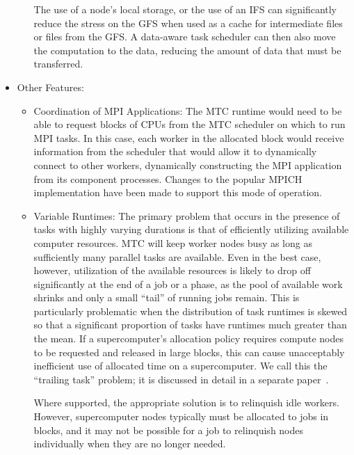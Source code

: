 \documentclass[10pt,letterpaper]{article}
\begin{document}
\begin{itemize}
\begin{itemize}
    The use of a node's local storage, or the use of an
     IFS  can significantly reduce the stress on
     the GFS when used as a cache for intermediate files or files
     from the GFS.  A data-aware task scheduler can then also
     move the computation to the data, reducing the amount of data that
     must be transferred.


  \end{itemize}

\item Other Features:

  \begin{itemize}

  \item Coordination of MPI Applications: The MTC runtime would need to
    be able to request blocks of CPUs from the MTC scheduler on which to run
    MPI tasks.  In this case, each worker in the allocated block
    would receive information from the scheduler that would allow it to
    dynamically connect to other workers, dynamically constructing the
    MPI application from its component processes.  Changes to the
    popular MPICH implementation have been made to support this mode
    of operation.

  \item Variable Runtimes: The primary problem that occurs in
    the presence of tasks with highly varying durations is that of
    efficiently utilizing available computer resources.  MTC 
    will keep worker nodes busy as long as
    sufficiently many parallel tasks are available.  Even in
    the best case, however, utilization of the available resources is
    likely to drop off significantly at the end of a job or a phase,
    as the pool of available work shrinks and only a small ``tail'' of
    running jobs remain.  This is particularly problematic when the
    distribution of task runtimes is skewed so that 
    a significant proportion of tasks have runtimes much greater
    than the mean.  If a supercomputer's allocation policy requires
    compute nodes to be requested and released in large blocks,
    this can cause unacceptably inefficient use of allocated time
    on a supercomputer.  We call this the ``trailing task''
    problem; it is discussed in detail in a
    separate paper~\cite{armstrong-10}.

    Where supported, the appropriate solution is to relinquish
    idle workers.  However, supercomputer nodes typically must be
    allocated to jobs in blocks, and it may not be possible for a job to
    relinquish nodes individually when they are no longer needed.


\end{itemize}
\end{itemize}
\end{document}
